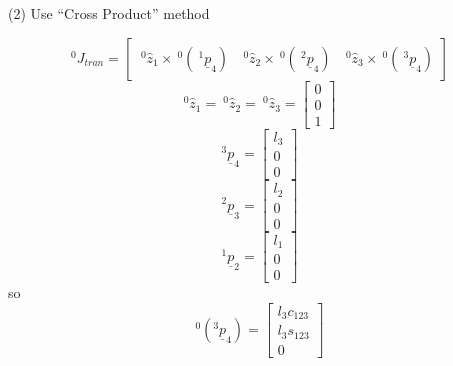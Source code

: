 \documentclass[]{article}
\begin{document}
(2) Use ``Cross Product'' method

\begin{displaymath}
^{0}J_{tran} = \left[ \begin{array}{ccc} \ \!^{0}\hat{z}_{1} \times \ \!^{0}(\ \!^{1}\underline{p}_{4}) & \ \!^{0}\hat{z}_{2} \times \ \!^{0}(\ \!^{2}\underline{p}_{4}) & \ \!^{0}\hat{z}_{3} \times \ \!^{0}(\ \!^{3}\underline{p}_{4}) \end{array} \right]
\end{displaymath}
\begin{displaymath}
^{0}\hat{z}_{1} = \ \!^{0}\hat{z}_{2} = \ \!^{0}\hat{z}_{3} = \left[\begin{array}{c} 0 \\ 0 \\ 1 \end{array}\right]
\end{displaymath}
\begin{displaymath}
^{3}\underline{p}_{4} = \left[ \begin{array}{c} l_{3} \\ 0 \\ 0 \end{array}\right]
\end{displaymath}
\begin{displaymath}
^{2}\underline{p}_{3} = \left[ \begin{array}{c} l_{2} \\ 0 \\ 0 \end{array}\right]
\end{displaymath}
\begin{displaymath}
^{1}\underline{p}_{2} = \left[ \begin{array}{c} l_{1} \\ 0 \\ 0 \end{array}\right]
\end{displaymath}
so
\begin{displaymath}
^{0}(^{3}\underline{p}_{4}) = \left[ \begin{array}{c} l_{3}c_{123} \\ l_{3}s_{123} \\ 0 \end{array} \right]
\end{displaymath}
\end{document}
